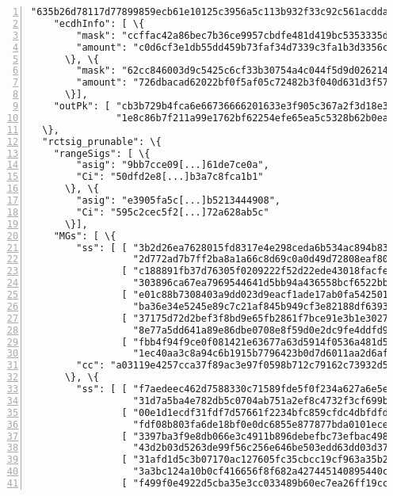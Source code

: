 \begin{appendices}
\begin{Verbatim}[commandchars=\\\{\}, numbers=left]
                    "635b26d78117d77899859ecb61e10125c3956a5c113b932f33c92c561acddaa3"], 
    "ecdhInfo": [ \{
        "mask": "ccffac42a86bec7b36ce9957cbdfe481d419bc5353335d0c236c347aea758d0c", 
        "amount": "c0d6cf3e1db55dd459b73faf34d7339c3fa1b3d3356cfb2adc3faf798264b00e"
      \}, \{
        "mask": "62cc846003d9c5425c6cf33b30754a4c044f5d9d02621460e45664b886673109", 
        "amount": "726dbacad62022bf0f5af05c72482b3f040d631d3f576b5e2615ea72f84c5f06"
      \}], 
    "outPk": [ "cb3b729b4fca6e66736666201633e3f905c367a2f3d18e31fe3d3c18d2be93fd", 
               "1e8c86b7f211a99e1762bf62254efe65ea5c5328b62b0ea8d679b2e52800f633"]
  \}, 
  "rctsig_prunable": \{
    "rangeSigs": [ \{
        "asig": "9bb7cce09[...]61de7ce0a", 
        "Ci": "50dfd2e8[...]b3a7c8fca1b1"
      \}, \{
        "asig": "e3905fa5c[...]b5213444908", 
        "Ci": "595c2cec5f2[...]72a628ab5c"
      \}], 
    "MGs": [ \{
        "ss": [ [ "3b2d26ea7628015fd8317e4e298ceda6b534ac894b83f7b6190a353cee6ec702", 
                  "2d772ad7b7ff2ba8a1a66c8d69c0a0d49d72808eaf803c59f13c3d78b653440c"], 
                [ "c188891fb37d76305f0209222f52d22ede43018facfe91f949ecb8dcf709b30a", 
                  "303896ca67ea7969544641d5bb94a436558bcf6522bb9bc77bd1abb5f2146c08"], 
                [ "e01c88b7308403a9dd023d9eacf1ade17ab0fa54250148431b5a33c98e636100", 
                  "ba36e34e5245e89c7c21af845b949cf3e82188df639390f094e31c9ba773060c"], 
                [ "37175d72d2bef3f8bd9e65fb2861f7bce91e3b1e30278b2dcf26112831ac9405", 
                  "8e77a5dd641a89e86dbe0708e8f59d0e2dc9fe4ddfd9b367c3a93522198a4706"], 
                [ "fbb4f94f9ce0f081421e63677a63d5914f0536a481d57b6e5fc5379c84dfcb05", 
                  "1ec40aa3c8a94c6b1915b7796423b0d7d6011aa2d6af636aff309b832f193408"]], 
        "cc": "a03119e4257cca37f89ac3e97f0598b712c79162c73932d58ab4ce08c4ad6709"
      \}, \{
        "ss": [ [ "f7aedeec462d7588330c71589fde5f0f234a627a6e5ed72cff34825a04d41707", 
                  "31d7a5ba4e782db5c0704ab751a2ef8c4732f3cf699bc8f9994e79a97cd3190e"], 
                [ "00e1d1ecdf31fdf7d57661f2234bfc859cfdc4dbfdfd0f5eec0576ef22592203", 
                  "fdf08b803fa6de18bf0e0dc6855e877877bda0101eceb81e2223fe0175606300"], 
                [ "3397ba3f9e8db066e3c4911b896debefbc73efbac4988e6aff5731ff8db15405", 
                  "43d2b03d5263de99f56c256e646be503edd63dd03d377a469379fbf487e8600e"], 
                [ "31afd1d5c3b07170ac127605fc35cbcc19cf963a35b2ff8f804e17e3b804000d", 
                  "3a3bc124a10b0cf416656f8f682a427445140895440cca644c6aa38966399f0c"], 
                [ "f499f0e4922d5cba35e3cc033489b60ec7ea26ff19cc9dd29357670f4bf8790b", 

\end{Verbatim}
\end{appendices}
